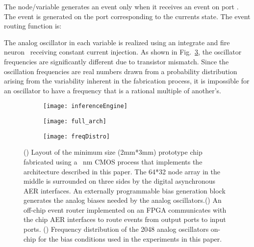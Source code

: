 \documentclass[10pt]{article}
\begin{document}
The node/variable generates an event only when it receives an event on port . The event is generated on the port corresponding to the currents state. The event routing function  is:


The analog oscillator in each variable is realized using an integrate and fire neuron~\cite{Indiveri_etal06} receiving constant current injection. As shown in Fig.~\ref{fig:arch_c}, the oscillator frequencies are significantly different due to transistor mismatch. Since the oscillation frequencies are real numbers drawn from a probability distribution arising from the variability inherent in the fabrication process, it is impossible for an oscillator to have a frequency that is a rational multiple of another's.

\begin{figure}[h]
 \centering

 \begin{subfigure}[b]{0.3\textwidth}
      \texttt{[image: inferenceEngine]} 
      \subcaption{}
      \label{fig:arch_a}
    \end{subfigure}
    \quad
 \begin{subfigure}[b]{0.3\textwidth}
     \texttt{[image: full\_arch]} 
     \subcaption{}
     \label{fig:arch_b}
   \end{subfigure}
   \quad
   \begin{subfigure}[b]{0.3\textwidth}
     \texttt{[image: freqDistro]} 
     \subcaption{}
     \label{fig:arch_c}
   \end{subfigure}


   \caption{() Layout of the minimum size (2mm*3mm) prototype chip fabricated using a \, nm CMOS process that implements the architecture described in this paper. The 64*32 node array in the middle is surrounded on three sides by the digital asynchronous AER interfaces. An externally programmable bias generation block generates the analog biases needed by the analog oscillators.() An off-chip event router implemented on an FPGA communicates with the chip AER interfaces to route events from output ports to input ports. () Frequency distribution of the 2048 analog oscillators on-chip for the bias conditions used in the experiments in this paper.}
\label{fig:arch}
\end{figure}	
\end{document}
